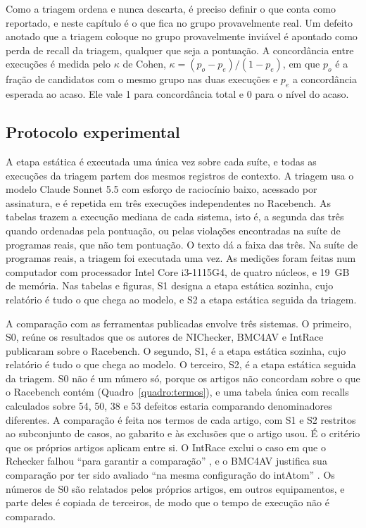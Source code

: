 Como a triagem ordena e nunca descarta, é preciso definir o que conta como
reportado, e neste capítulo é o que fica no grupo provavelmente real. Um defeito
anotado que a triagem coloque no grupo provavelmente inviável é apontado como
perda de recall da triagem, qualquer que seja a pontuação. A concordância entre
execuções é medida pelo $\kappa$ de Cohen, $\kappa = (p_o - p_e)/(1 - p_e)$, em
que $p_o$ é a fração de candidatos com o mesmo grupo nas duas execuções e $p_e$
a concordância esperada ao acaso. Ele vale 1 para concordância total e 0 para
o nível do acaso.

\subsection{Protocolo experimental}
\label{sec:protocolo}

A etapa estática é executada uma única vez sobre cada suíte, e todas as
execuções da triagem partem dos mesmos registros de contexto. A triagem usa o
modelo Claude Sonnet 5.5 com esforço de raciocínio baixo, acessado por
assinatura, e é repetida em três execuções independentes no Racebench. As
tabelas trazem a execução mediana de cada sistema, isto é, a segunda das três
quando ordenadas pela pontuação, ou pelas violações encontradas na suíte de
programas reais, que não tem pontuação. O texto dá a faixa das três. Na suíte de programas reais, a triagem foi executada uma vez.
As medições foram feitas num computador com processador Intel Core i3-1115G4,
de quatro núcleos, e 19~GB de memória. Nas tabelas e figuras, S1 designa a
etapa estática sozinha, cujo relatório é tudo o que chega ao modelo, e S2 a
etapa estática seguida da triagem.

\iffalse
A comparação com as ferramentas publicadas envolve três sistemas. O primeiro,
S0, reúne os resultados que os autores de NIChecker, BMC4AV e IntRace
publicaram sobre o Racebench. O segundo, S1, é a etapa estática sozinha, cujo
relatório é tudo o que chega ao modelo. O terceiro, S2, é a etapa estática
seguida da triagem. S0 não é um número só, porque os artigos não concordam
sobre o que o Racebench contém (Quadro~\ref{quadro:termos}), e uma tabela única
com recalls calculados sobre 54, 50, 38 e 53 defeitos estaria comparando
denominadores diferentes. A comparação é feita nos termos de cada
artigo, com S1 e S2 restritos ao subconjunto de casos, ao gabarito e às
exclusões que o artigo usou. É o critério que os próprios artigos aplicam entre
si. O IntRace exclui o caso em que o Rchecker falhou ``para garantir a
comparação'' \cite{intrace}, e o BMC4AV justifica sua comparação por ter sido
avaliado ``na mesma configuração do intAtom'' \cite{bmc4av}. Os números de S0 são relatados
pelos próprios artigos, em outros equipamentos, e parte deles é copiada de
terceiros, de modo que o tempo de execução não é comparado.

